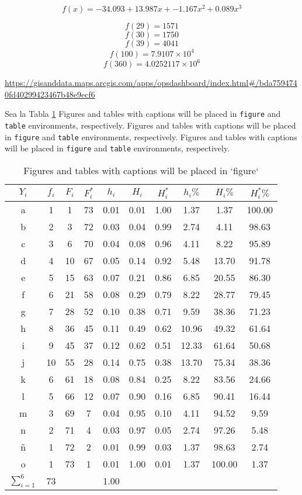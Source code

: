 \documentclass[10pt,]{krantz}
\theoremstyle{definition}
\theoremstyle{definition}
\theoremstyle{definition}
\theoremstyle{remark}
\begin{document}
\[f(x)=-34.093+13.987x+-1.167x^2+0.089x^3\]

\[f(29)=1571\]
\[f(30)=1750\]
\[f(39)=4041\]
\[f(100)=\ensuremath{7.9107\times 10^{4}}\]
\[f(360)=\ensuremath{4.0252117\times 10^{6}}\]

\url{https://gisanddata.maps.arcgis.com/apps/opsdashboard/index.html\#/bda7594740fd40299423467b48e9ecf6}

Sea la Tabla \ref{tab:2w3} Figures and tables with captions will be placed in \texttt{figure} and \texttt{table} environments, respectively.
Figures and tables with captions will be placed in \texttt{figure} and \texttt{table} environments, respectively.
Figures and tables with captions will be placed in \texttt{figure} and \texttt{table} environments, respectively.

\begin{longtable}[t]{cccccccccc}
\caption{\label{tab:2w3}Figures and tables with captions will be placed in `figure`}\\
\toprule
$Y_i$ & $f_i$ & $F_i$ & $F_i^*$ & $h_i$ & $H_i$ & $H_i^*$ & $h_i\%$ & $H_i\%$ & $H_i^*\%$\\
\midrule
a & 1 & 1 & 73 & 0.01 & 0.01 & 1.00 & 1.37 & 1.37 & 100.00\\
b & 2 & 3 & 72 & 0.03 & 0.04 & 0.99 & 2.74 & 4.11 & 98.63\\
c & 3 & 6 & 70 & 0.04 & 0.08 & 0.96 & 4.11 & 8.22 & 95.89\\
d & 4 & 10 & 67 & 0.05 & 0.14 & 0.92 & 5.48 & 13.70 & 91.78\\
e & 5 & 15 & 63 & 0.07 & 0.21 & 0.86 & 6.85 & 20.55 & 86.30\\
f & 6 & 21 & 58 & 0.08 & 0.29 & 0.79 & 8.22 & 28.77 & 79.45\\
g & 7 & 28 & 52 & 0.10 & 0.38 & 0.71 & 9.59 & 38.36 & 71.23\\
h & 8 & 36 & 45 & 0.11 & 0.49 & 0.62 & 10.96 & 49.32 & 61.64\\
i & 9 & 45 & 37 & 0.12 & 0.62 & 0.51 & 12.33 & 61.64 & 50.68\\
j & 10 & 55 & 28 & 0.14 & 0.75 & 0.38 & 13.70 & 75.34 & 38.36\\
k & 6 & 61 & 18 & 0.08 & 0.84 & 0.25 & 8.22 & 83.56 & 24.66\\
l & 5 & 66 & 12 & 0.07 & 0.90 & 0.16 & 6.85 & 90.41 & 16.44\\
m & 3 & 69 & 7 & 0.04 & 0.95 & 0.10 & 4.11 & 94.52 & 9.59\\
n & 2 & 71 & 4 & 0.03 & 0.97 & 0.05 & 2.74 & 97.26 & 5.48\\
ñ & 1 & 72 & 2 & 0.01 & 0.99 & 0.03 & 1.37 & 98.63 & 2.74\\
o & 1 & 73 & 1 & 0.01 & 1.00 & 0.01 & 1.37 & 100.00 & 1.37\\
$\sum_{i=1}^6$ & 73 &  &  & 1.00 &  &  &  &  & \\
\bottomrule
\end{longtable}
\end{document}
